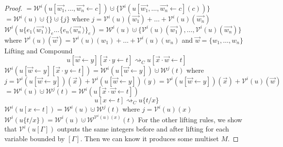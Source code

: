 \documentclass[a4paper,UKenglish,cleveref, autoref]{lipics-v2019}
\newcommand{\set}[1]{ \{ #1 \} }
\newcommand{\share}[3]{#1 [#2 \leftarrow #3]}
\newcommand{\fakedist}[2]{#1 \langle \, #2 \, \rangle}
\newcommand{\sub}[3]{#1 \{ #2 / #3 \}}
\newcommand{\exor}[3]{#1 \{ \fakedist{#2}{#3} \}_{e}}
\newcommand{\weight}[2]{\mathcal{W}^{#1}(#2)}
\newcommand{\weightvar}[2]{\mathcal{V}^{#1}(#2)}
\begin{document}
\begin{proof}
$= \weight{i}{u \share{}{\vec{w_{1}}, \dots, \vec{w_{n}}}{c}} \cupdot \set{\weightvar{i}{u \share{}{\vec{w_{1}}, \dots, \vec{w_{n}}}{c}(c)}}$
\newline
$= \weight{i}{u} \cupdot \set{} \cupdot \set{j}$
\newline
where $j = \weightvar{i}{u}(\vec{w_{1}}) + \dots + \weightvar{i}{u}(\vec{w_{n}})$
\newline
$\weight{i}{\exor{\exor{u}{e_{1}}{\vec{w_{1}}} \dots}{e_{n}}{\vec{w_{n}}}} = \weight{i}{u} \cupdot \set{\weightvar{i}{u}(\vec{w_{1}}), \dots , \weightvar{i}{u}(\vec{w_{n}})}$
\newline
where $\weightvar{i}{u}(\vec{w}) = \weightvar{i}{u}(w_{1}) + \dots + \weightvar{i}{u}(w_{n})$ and $\vec{w} = \set{w_{1}, \dots, w_{n}}$
\newline
\newline
Lifting and Compound
$$\share{\share{u}{\vec{w}}{y}}{\vec{x} \cdot y}{t} \rightsquigarrow_{C} \share{u}{\vec{x} \cdot \vec{w}}{t}$$
$\weight{i}{\share{\share{u}{\vec{w}}{y}}{\vec{x} \cdot y}{t}} = \weight{i}{\share{u}{\vec{w}}{y}} \cupdot \weight{j}{t}$
\newline
where $j = \weightvar{i}{\share{u}{\vec{w}}{y}}(\vec{x}) + \weightvar{i}{\share{u}{\vec{w}}{y}}(y) = \weightvar{i}{\share{u}{\vec{w}}{y}}(\vec{x}) + \weightvar{i}{u}(\vec{w})$
\newline
$= \weight{i}{u} \cupdot \weight{j}{t} = \weight{i}{\share{u}{\vec{x} \cdot \vec{w}}{t}}$
\newline
\newline
$$\share{u}{x}{t} \rightsquigarrow_{C} \sub{u}{t}{x} $$
$\weight{i}{\share{u}{x}{t}} = \weight{i}{u} \cupdot \weight{j}{t}$
\newline
where $j = \weightvar{i}{u}(x)$
\newline
$\weight{i}{ \sub{u}{t}{x}} = \weight{i}{u} \cupdot \weight{\weightvar{i}{u}(x)}{t}$
\newline
\newline
For the other lifting rules, we show that $\weightvar{i}{u[\Gamma]}$ outputs the same integers before and after lifting for each variable bounded by $[\Gamma]$. Then we can know it produces some multiset $M$. 


\end{proof}
\end{document}
